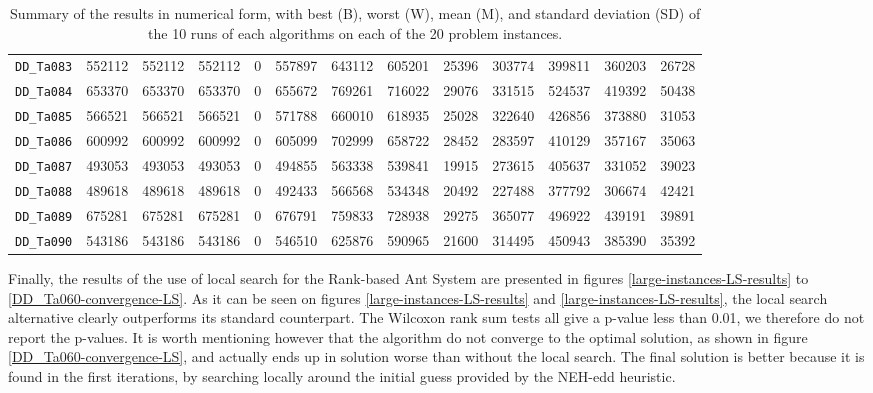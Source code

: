 \documentclass[runningheads]{llncs}
\begin{document}
\begin{table}
\begin{tabular}{lrrrrrrrrrrrr}
    	\texttt{DD\_Ta083} & 552112 & 552112 & 552112 &  0 & 557897 & 643112 & 605201 & 25396 & 303774 & 399811 & 360203 & 26728 \\
    	\texttt{DD\_Ta084} & 653370 & 653370 & 653370 &  0 & 655672 & 769261 & 716022 & 29076 & 331515 & 524537 & 419392 & 50438 \\
    	\texttt{DD\_Ta085} & 566521 & 566521 & 566521 &  0 & 571788 & 660010 & 618935 & 25028 & 322640 & 426856 & 373880 & 31053 \\
    	\texttt{DD\_Ta086} & 600992 & 600992 & 600992 &  0 & 605099 & 702999 & 658722 & 28452 & 283597 & 410129 & 357167 & 35063 \\
    	\texttt{DD\_Ta087} & 493053 & 493053 & 493053 &  0 & 494855 & 563338 & 539841 & 19915 & 273615 & 405637 & 331052 & 39023 \\
    	\texttt{DD\_Ta088} & 489618 & 489618 & 489618 &  0 & 492433 & 566568 & 534348 & 20492 & 227488 & 377792 & 306674 & 42421 \\
    	\texttt{DD\_Ta089} & 675281 & 675281 & 675281 &  0 & 676791 & 759833 & 728938 & 29275 & 365077 & 496922 & 439191 & 39891 \\
    	\texttt{DD\_Ta090} & 543186 & 543186 & 543186 &  0 & 546510 & 625876 & 590965 & 21600 & 314495 & 450943 & 385390 & 35392 \\
		\bottomrule
	\end{tabular}
	\caption{Summary of the results in numerical form, with best (B), worst (W),
	mean (M), and standard deviation (SD) of the 10 runs of each algorithms on
	each of the 20 problem instances.}
	\label{tab:res}
\end{table}


Finally, the results of the use of local search for the Rank-based Ant System
are presented in figures \ref{large-instances-LS-results} to
\ref{DD_Ta060-convergence-LS}. As it can be seen on figures
\ref{large-instances-LS-results} and \ref{large-instances-LS-results}, the local
search alternative clearly outperforms its standard counterpart. The Wilcoxon
rank sum tests all give a p-value less than 0.01, we therefore do not report the
p-values. It is worth mentioning however that the algorithm do not converge to
the optimal solution, as shown in figure \ref{DD_Ta060-convergence-LS}, and
actually ends up in solution worse than without the local search. The final
solution is better because it is found in the first iterations, by searching
locally around the initial guess provided by the NEH-edd heuristic.
\end{document}
